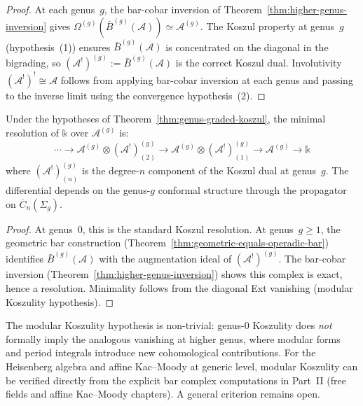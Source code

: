 \begin{proof}
At each genus~$g$, the bar-cobar inversion of Theorem~\ref{thm:higher-genus-inversion}
gives $\Omega^{(g)}(\bar{B}^{(g)}(\mathcal{A})) \simeq \mathcal{A}^{(g)}$.
The Koszul property at genus~$g$ (hypothesis~(1)) ensures
$\bar{B}^{(g)}(\mathcal{A})$ is concentrated on the diagonal in the bigrading,
so $(\mathcal{A}^!)^{(g)} := \bar{B}^{(g)}(\mathcal{A})$ is the correct Koszul dual.
Involutivity $(\mathcal{A}^!)^! \cong \mathcal{A}$ follows from applying
bar-cobar inversion at each genus and passing to the inverse limit using the
convergence hypothesis~(2).
\end{proof}

\begin{lemma}
\label{lem:genus-graded-koszul-resolution}
Under the hypotheses of Theorem~\ref{thm:genus-graded-koszul}, the minimal
resolution of $\mathbb{k}$ over $\mathcal{A}^{(g)}$ is:
\[\cdots \to \mathcal{A}^{(g)} \otimes (\mathcal{A}^!)^{(g)}_{(2)}
\to \mathcal{A}^{(g)} \otimes (\mathcal{A}^!)^{(g)}_{(1)}
\to \mathcal{A}^{(g)} \to \mathbb{k}\]
where $(\mathcal{A}^!)^{(g)}_{(n)}$ is the degree-$n$ component of the
Koszul dual at genus~$g$.  The differential depends on the genus-$g$
conformal structure through the propagator on $\overline{C}_n(\Sigma_g)$.
\end{lemma}

\begin{proof}
At genus~0, this is the standard Koszul resolution.
At genus~$g \geq 1$, the geometric bar construction
(Theorem~\ref{thm:geometric-equals-operadic-bar}) identifies
$\bar{B}^{(g)}(\mathcal{A})$ with the augmentation ideal of
$(\mathcal{A}^!)^{(g)}$.  The bar-cobar inversion
(Theorem~\ref{thm:higher-genus-inversion}) shows this complex is exact,
hence a resolution.  Minimality follows from the diagonal Ext vanishing
(modular Koszulity hypothesis).
\end{proof}

\begin{remark}\label{rem:genus-graded-obstruction}
The modular Koszulity hypothesis is non-trivial: genus-0 Koszulity does
\emph{not} formally imply the analogous vanishing at higher genus, where
modular forms and period integrals introduce new cohomological contributions.
For the Heisenberg algebra and affine Kac--Moody at generic level, modular
Koszulity can be verified directly from the explicit bar complex computations
in Part~II (free fields and affine Kac--Moody chapters).
A general criterion remains open.
\end{remark}

